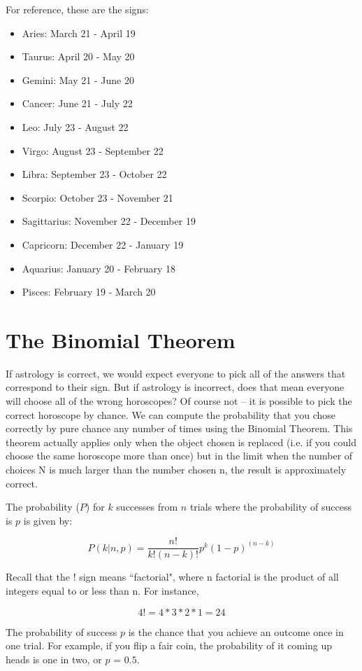 \documentclass[12pt]{article}
\begin{document}
\noindent For reference, these are the signs:
\begin{itemize}
\item Aries: March 21 - April 19
\item Taurus: April 20 - May 20
\item Gemini: May 21 - June 20
\item Cancer: June 21 - July 22
\item Leo: July 23 - August 22
\item Virgo: August 23 - September 22
\item Libra: September 23 - October 22
\item Scorpio: October 23 - November 21
\item Sagittarius: November 22  - December 19
\item Capricorn: December 22 - January 19
\item Aquarius: January 20 - February 18
\item Pisces: February 19 - March 20
\end{itemize}

\section*{The Binomial Theorem}
If astrology is correct, we would expect everyone to pick all of the answers that correspond to their sign. But if astrology is incorrect, does that mean everyone will choose all of the wrong horoscopes? Of course not -- it is possible to pick the correct horoscope by chance. We can compute the probability that you chose correctly by pure chance any number of times using the Binomial Theorem. This theorem actually applies only when the object chosen is replaced (i.e. if you could choose the same horoscope more than once) but in the limit when the number of choices N is much larger than the number chosen n, the result is approximately correct.

The probability ($P$) for $k$ successes from $n$ trials where the probability of success is $p$ is given by:

\[P(k|n,p) = \frac{n!}{k!(n-k)!}p^{k}(1-p)^{(n-k)}\]

\vspace{1mm}
\noindent Recall that the ! sign means ``factorial", where n factorial is the product of all integers equal to or less than n. For instance, 

\[4! = 4*3*2*1 = 24\]

\noindent The probability of success $p$ is the chance that you achieve an outcome once in one trial. For example, if you flip a fair coin, the probability of it coming up heads is one in two, or $p$ = $0.5$. \\
\end{document}
